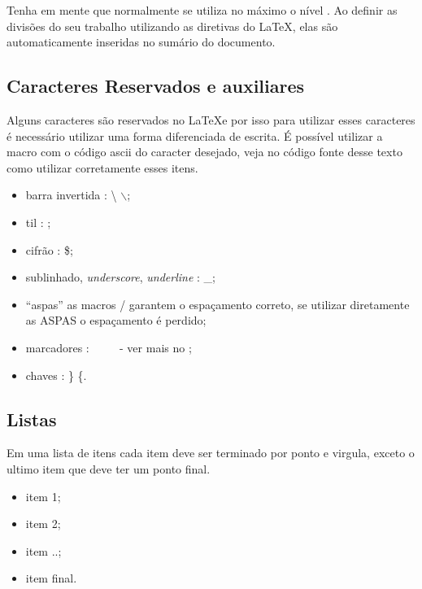 Tenha em mente que normalmente se utiliza no máximo o nível .
Ao definir as divisões do seu trabalho utilizando as diretivas do \LaTeX, elas são automaticamente inseridas no sumário do documento.


\subsection{Caracteres Reservados e auxiliares}



Alguns caracteres são reservados no \LaTeX \space e por isso para utilizar esses caracteres é necessário utilizar uma forma diferenciada de escrita. É possível utilizar a macro  com o código \ac{ascii} do caracter desejado, veja no código fonte desse texto como utilizar corretamente esses itens.


\begin{itemize}
\item barra invertida : \textbackslash   {}    $\backslash$;
\item til  :   ;
\item cifrão : \$;
\item sublinhado, \textit{underscore}, \textit{underline} : \_;
\item \enquote{aspas} as macros  /  garantem o espaçamento correto, se utilizar diretamente as ASPAS o espaçamento é perdido;
\item marcadores : \cmark\ \xmark\ \circlemark\  \ - ver mais no ;
\item chaves : \} \{.
\end{itemize}

\subsection{Listas}

Em uma lista de itens cada item deve ser terminado por ponto e virgula, exceto o ultimo item que deve ter um ponto final.

\begin{itemize}
\item item 1;
\item item 2;
\item item ..;
\item item final.
\end{itemize}


